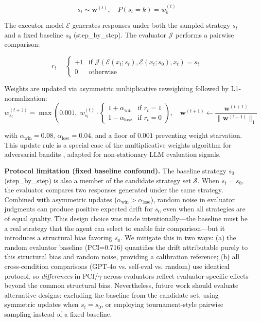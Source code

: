 \documentclass[11pt,a4paper]{article}
\begin{document}
\begin{equation}
s_t \sim \mathbf{w}^{(t)}, \quad P(s_t = k) = w_k^{(t)}
\end{equation}

The executor model $\mathcal{E}$ generates responses under both the sampled strategy $s_t$ and a fixed baseline $s_0$ (step\_by\_step). The evaluator $\mathcal{J}$ performs a pairwise comparison:

\begin{equation}
r_t = \begin{cases}
+1 & \text{if } \mathcal{J}(\mathcal{E}(x_t; s_t), \mathcal{E}(x_t; s_0), x_t) = s_t \\
0 & \text{otherwise}
\end{cases}
\end{equation}

Weights are updated via asymmetric multiplicative reweighting followed by L1-normalization:
\begin{equation}
w_{s_t}^{(t+1)} = \max\left(0.001,\; w_{s_t}^{(t)} \cdot \begin{cases}
1 + \alpha_{\text{win}} & \text{if } r_t = 1 \\
1 - \alpha_{\text{lose}} & \text{if } r_t = 0
\end{cases}\right), \quad
\mathbf{w}^{(t+1)} \leftarrow \frac{\mathbf{w}^{(t+1)}}{\|\mathbf{w}^{(t+1)}\|_1}
\end{equation}

with $\alpha_{\text{win}} = 0.08$, $\alpha_{\text{lose}} = 0.04$, and a floor of $0.001$ preventing weight starvation. This update rule is a special case of the multiplicative weights algorithm for adversarial bandits \cite{arora2012multiplicative}, adapted for non-stationary LLM evaluation signals.

\textbf{Protocol limitation (fixed baseline confound).} The baseline strategy $s_0$ (step\_by\_step) is also a member of the candidate strategy set $\mathcal{S}$. When $s_t = s_0$, the evaluator compares two responses generated under the same strategy. Combined with asymmetric updates ($\alpha_{\text{win}} > \alpha_{\text{lose}}$), random noise in evaluator judgments can produce positive expected drift for $s_0$ even when all strategies are of equal quality. This design choice was made intentionally---the baseline must be a real strategy that the agent can select to enable fair comparison---but it introduces a structural bias favoring $s_0$. We mitigate this in two ways: (a) the random evaluator baseline (PCI=0.716) quantifies the drift attributable purely to this structural bias and random noise, providing a calibration reference; (b) all cross-condition comparisons (GPT-4o vs. self-eval vs. random) use identical protocol, so \textit{differences} in PCI/$\gamma$ across evaluators reflect evaluator-specific effects beyond the common structural bias. Nevertheless, future work should evaluate alternative designs: excluding the baseline from the candidate set, using symmetric updates when $s_t = s_0$, or employing tournament-style pairwise sampling instead of a fixed baseline.
\end{document}
